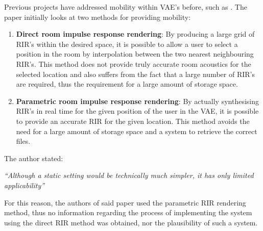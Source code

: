 \documentclass[../../main.tex]{subfiles}
\begin{document}
		Previous projects have addressed mobility within \ac{VAE}'s before, such as \cite{Savioja1999}. The paper initially looks at two methods for providing mobility:


		\begin{enumerate}

		 \item \textbf{Direct room impulse response rendering}: By producing a large grid of \ac{RIR}'s within the desired space, it is possible to allow a user to select a position in the room by interpolation between the two nearest neighbouring \ac{RIR}'s. This method does not provide truly accurate room acoustics for the selected location and also suffers from the fact that a large number of \ac{RIR}'s are required, thus the requirement for a large amount of storage space.

		\item \textbf{Parametric room impulse response rendering}: By actually synthesising \ac{RIR}'s in real time for the given position of the user in the \ac{VAE}, it is possible to provide an accurate \ac{RIR} for the given location. This method avoids the need for a large amount of storage space and a system to retrieve the correct files.
		\end{enumerate}

		The author stated:

		 \vspace{5mm}
		 \begin{center}
		 \begin{minipage}{0.5\textwidth}
		 \textit{``Although a static setting would be technically much simpler, it has only limited applicability''}
		 \end{minipage}
		 \end{center}
		 \vspace{5mm}

		For this reason, the authors of said paper used the parametric \ac{RIR} rendering method, thus no information regarding the process of implementing the system using the direct \ac{RIR} method was obtained, nor the plausibility of such a system. 

\end{document}
